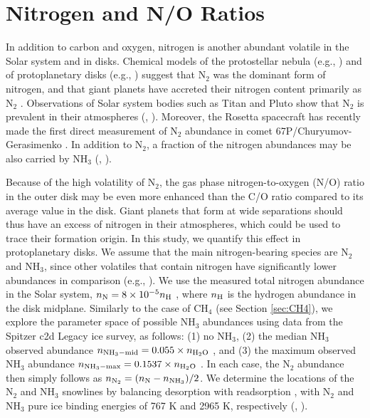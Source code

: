 \documentclass[apj]{emulateapj}
\begin{document}
\section{Nitrogen and N/O Ratios}
\label{sec:N}

In addition to carbon and oxygen, nitrogen is another abundant volatile in the Solar system and in disks. Chemical models of the protostellar nebula (e.g., \citealt{owen01}) and of protoplanetary disks (e.g., \citealt{rodgers02}) suggest that N$_2$ was the dominant form of nitrogen, and that giant planets have accreted their nitrogen content primarily as N$_2$ \citep{mousis14}. Observations of Solar system bodies such as Titan and Pluto show that N$_2$ is prevalent in their atmospheres (\citealt{cruikshank93}, \citealt{owen93}).  Moreover, the Rosetta spacecraft has recently made the first direct measurement of N$_2$ abundance in comet 67P/Churyumov-Gerasimenko \citep{rubin15}. In addition to N$_2$, a fraction of the nitrogen abundances may be also carried by NH$_3$ (\citealt{bottinelli10}, \citealt{mumma11}). 

Because of the high volatility of N$_2$, the gas phase nitrogen-to-oxygen (N/O) ratio in the outer disk
may be even more enhanced than the C/O ratio compared to its average value in the disk. Giant planets that form at wide separations should thus have an excess of nitrogen in their atmospheres, which could be used to trace their formation origin.  In this study, we quantify this effect in protoplanetary disks. We assume that the main nitrogen-bearing species are N$_2$ and NH$_3$, since other volatiles that contain nitrogen have significantly lower abundances in comparison (e.g., \citealt{mumma11}). We use the measured total nitrogen abundance in the Solar system, $n_{\rm N}=8 \times 10^{-5} n_{\rm H}$ \citep{lodders03}, where $n_{\rm H}$ is the hydrogen abundance in the disk midplane. Similarly to the case of CH$_4$ (see Section \ref{sec:CH4}), we explore the parameter space of possible NH$_3$ abundances using data from the Spitzer c2d Legacy ice survey, as follows: (1) no NH$_3$, (2) the median NH$_3$ observed abundance $n_{\rm NH_3-mid}=0.055 \times n_{\rm H_2O}$ \citep{oberg11a}, and (3) the maximum observed NH$_3$ abundance $n_{\rm NH_3-max}=0.1537 \times n_{\rm H_2O}$ \citep{bottinelli10}. In each case, the N$_2$ abundance then simply follows as $n_{\rm N_2}=(n_{\rm N}-n_{\rm NH_3})/2$. We determine the locations of the N$_2$ and NH$_3$ snowlines by balancing desorption with readsorption \citep{hollenbach09}, with N$_2$ and NH$_3$ pure ice binding energies of  767 K and  2965 K, respectively (\citealt{fayolle16}, \citealt{martin14}). 
\end{document}
